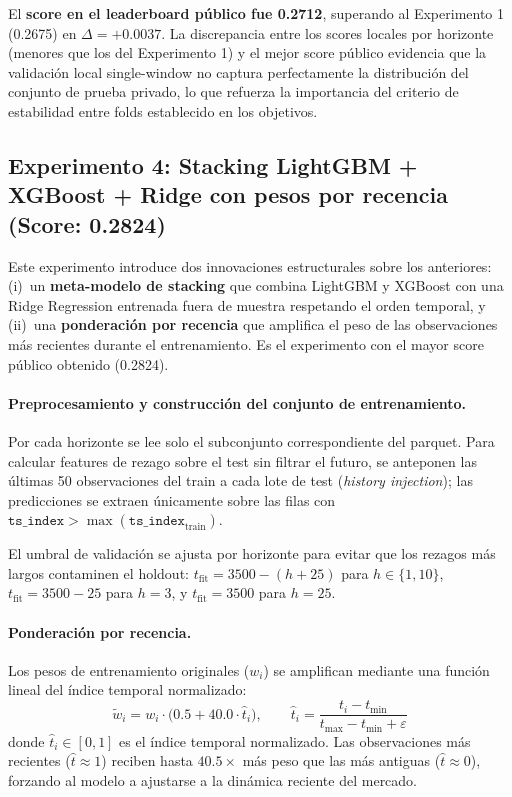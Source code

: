 \documentclass{article}
\begin{document}
El \textbf{score en el leaderboard público fue 0.2712}, superando al Experimento 1 (0.2675) en $\Delta = +0.0037$. La discrepancia entre los scores locales por horizonte (menores que los del Experimento 1) y el mejor score público evidencia que la validación local single-window no captura perfectamente la distribución del conjunto de prueba privado, lo que refuerza la importancia del criterio de estabilidad entre folds establecido en los objetivos.

\subsection{Experimento 4: Stacking LightGBM + XGBoost + Ridge con pesos por recencia (Score: 0.2824)}

Este experimento introduce dos innovaciones estructurales sobre los anteriores: (i)~un \textbf{meta-modelo de stacking} que combina LightGBM y XGBoost con una Ridge Regression entrenada fuera de muestra respetando el orden temporal, y (ii)~una \textbf{ponderación por recencia} que amplifica el peso de las observaciones más recientes durante el entrenamiento. Es el experimento con el mayor score público obtenido (0.2824).

\paragraph{Preprocesamiento y construcción del conjunto de entrenamiento.}
Por cada horizonte se lee solo el subconjunto correspondiente del parquet. Para calcular features de rezago sobre el test sin filtrar el futuro, se anteponen las últimas 50 observaciones del train a cada lote de test (\emph{history injection}); las predicciones se extraen únicamente sobre las filas con $\texttt{ts\_index} > \max(\texttt{ts\_index}_{\text{train}})$.

El umbral de validación se ajusta por horizonte para evitar que los rezagos más largos contaminen el holdout: $t_{\text{fit}} = 3500 - (h + 25)$ para $h \in \{1, 10\}$, $t_{\text{fit}} = 3500 - 25$ para $h = 3$, y $t_{\text{fit}} = 3500$ para $h = 25$.

\paragraph{Ponderación por recencia.}
Los pesos de entrenamiento originales ($w_i$) se amplifican mediante una función lineal del índice temporal normalizado:
\begin{equation}
  \tilde{w}_i = w_i \cdot \bigl(0.5 + 40.0 \cdot \hat{t}_i\bigr), \qquad
  \hat{t}_i = \frac{t_i - t_{\min}}{t_{\max} - t_{\min} + \varepsilon}
  \label{eq:recency}
\end{equation}
donde $\hat{t}_i \in [0,1]$ es el índice temporal normalizado. Las observaciones más recientes ($\hat{t} \approx 1$) reciben hasta $40.5\times$ más peso que las más antiguas ($\hat{t} \approx 0$), forzando al modelo a ajustarse a la dinámica reciente del mercado.
\end{document}

